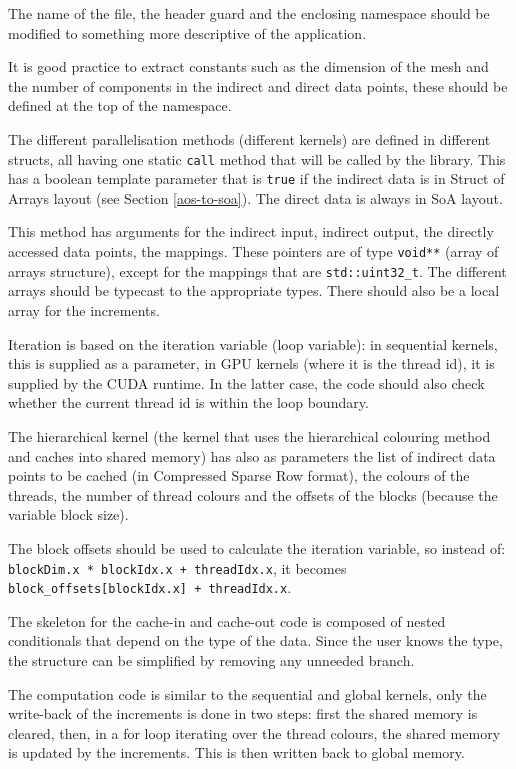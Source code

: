 The name of the file, the header guard and the enclosing namespace should be
modified to something more descriptive of the application.

It is good practice to extract constants such as the dimension of the mesh and
the number of components in the indirect and direct data points, these should be
defined at the top of the namespace.

The different parallelisation methods (different kernels) are defined in
different structs, all having one static \lstinline!call! method that will be
called by the library. This has a boolean template parameter that is
\lstinline!true! if the indirect data is in Struct of Arrays layout (see Section
\ref{aos-to-soa}). The direct data is always in SoA layout.

This method has arguments for the indirect input, indirect output, the directly
accessed data points, the mappings. These pointers are of type
\lstinline!void**! (array of arrays structure), except for the mappings that are
\lstinline!std::uint32_t!. The different arrays should be typecast to the
appropriate types. There should also be a local array for the increments.

Iteration is based on the iteration variable (loop variable): in sequential
kernels, this is supplied as a parameter, in GPU kernels (where it is the thread
id), it is supplied by the CUDA runtime. In the latter case, the code should
also check whether the current thread id is within the loop boundary.

The hierarchical kernel (the kernel that uses the hierarchical colouring method
and caches into shared memory) has also as parameters the list of indirect data
points to be cached (in Compressed Sparse Row format), the colours of the
threads, the number of thread colours and the offsets of the blocks (because the
variable block size).

The block offsets should be used to calculate the iteration variable, so instead
of: \lstinline!blockDim.x * blockIdx.x + threadIdx.x!, it becomes
\lstinline!block_offsets[blockIdx.x] + threadIdx.x!.

The skeleton for the cache-in and cache-out code is composed of nested
conditionals that depend on the type of the data. Since the user knows the type,
the structure can be simplified by removing any unneeded branch.

The computation code is similar to the sequential and global kernels, only the
write-back of the increments is done in two steps: first the shared memory is
cleared, then, in a for loop iterating over the thread colours, the shared
memory is updated by the increments. This is then written back to global memory.

